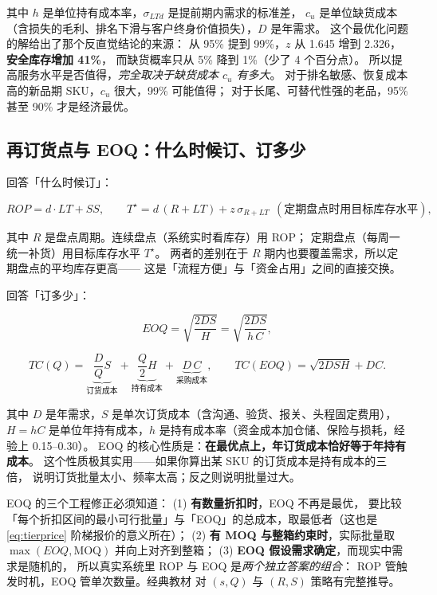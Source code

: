 其中 $h$ 是单位持有成本率，$\sigma_{LTd}$ 是提前期内需求的标准差，
$c_u$ 是单位缺货成本（含损失的毛利、排名下滑与客户终身价值损失），$D$ 是年需求。
这个最优化问题的解给出了那个反直觉结论的来源：
从 95\% 提到 99\%，$z$ 从 1.645 增到 2.326，\textbf{安全库存增加 41\%}，
而缺货概率只从 5\% 降到 1\%（少了 4 个百分点）。
所以提高服务水平是否值得，\emph{完全取决于缺货成本 $c_u$ 有多大}。
对于排名敏感、恢复成本高的新品期 SKU，$c_u$ 很大，99\% 可能值得；
对于长尾、可替代性强的老品，95\% 甚至 90\% 才是经济最优。

\subsection{再订货点与 EOQ：什么时候订、订多少}

 回答「什么时候订」：

\begin{equation}
ROP = d\cdot LT + SS,
\qquad
T^{\star} = d\,(R + LT) + z\,\sigma_{R+LT} \ \ (\text{定期盘点时用目标库存水平}),
\label{eq:rop}
\end{equation}

其中 $R$ 是盘点周期。连续盘点（系统实时看库存）用 ROP；
定期盘点（每周一统一补货）用目标库存水平 $T^{\star}$。
两者的差别在于 $R$ 期内也要覆盖需求，所以定期盘点的平均库存更高——
这是「流程方便」与「资金占用」之间的直接交换。

 回答「订多少」：

\begin{equation}
EOQ = \sqrt{\frac{2DS}{H}} = \sqrt{\frac{2DS}{h\,C}},
\label{eq:eoq}
\end{equation}

\begin{equation}
TC(Q) = \underbrace{\frac{D}{Q}S}_{\text{订货成本}} + \underbrace{\frac{Q}{2}H}_{\text{持有成本}} + \underbrace{D\,C}_{\text{采购成本}},
\qquad
TC(EOQ) = \sqrt{2DSH} + DC .
\label{eq:tc}
\end{equation}

其中 $D$ 是年需求，$S$ 是单次订货成本（含沟通、验货、报关、头程固定费用），
$H = hC$ 是单位年持有成本，$h$ 是持有成本率（资金成本加仓储、保险与损耗，经验上 0.15--0.30）。
EOQ 的核心性质是：\textbf{在最优点上，年订货成本恰好等于年持有成本}。
这个性质极其实用——如果你算出某 SKU 的订货成本是持有成本的三倍，
说明订货批量太小、频率太高；反之则说明批量过大。

EOQ 的三个工程修正必须知道：
(1) \textbf{有数量折扣时}，EOQ 不再是最优，
要比较「每个折扣区间的最小可行批量」与「EOQ」的总成本，取最低者（这也是 \cref{eq:tierprice} 阶梯报价的意义所在）；
(2) \textbf{有 MOQ 与整箱约束时}，实际批量取 $\max(EOQ, \text{MOQ})$ 并向上对齐到整箱；
(3) \textbf{EOQ 假设需求确定}，而现实中需求是随机的，
所以真实系统里 ROP 与 EOQ 是\emph{两个独立答案的组合}：
ROP 管触发时机，EOQ 管单次数量。经典教材 \cite{silver1998inventory} 对 $(s, Q)$ 与 $(R, S)$ 策略有完整推导。

